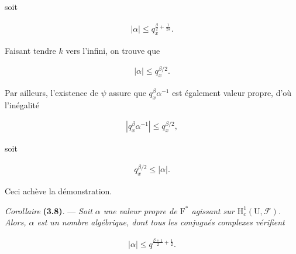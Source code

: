 \documentclass[10pt,leqno]{article}
\begin{document}
\noindent soit\par

\begin{equation*}\begin{gathered}|\alpha | \leq  q_{x}^{\frac{\beta}{2}+\frac{1}{2k}}.\end{gathered}\end{equation*}

\noindent Faisant tendre \(k\) vers l’infini, on trouve que\par

\begin{equation*}\begin{gathered}|\alpha | \leq  q_{x}^{\beta /2}.\end{gathered}\end{equation*}

\noindent Par ailleurs, l’existence de \(\psi \) assure que \(q_{x}^{\beta } \alpha ^{- 1}\) est également valeur propre, d’où l’inégalité\par

\begin{equation*}\begin{gathered}|q_{x}^{\beta } \alpha ^{- 1}| \leq  q_{x}^{\beta /2},\end{gathered}\end{equation*}

\noindent soit\par

\begin{equation*}\begin{gathered}q_{x}^{\beta /2} \leq  |\alpha |.\end{gathered}\end{equation*}

\noindent Ceci achève la démonstration.\par

\clearpage

\label{physical-15}\par\smallskip

\noindent \emph{Corollaire} \textbf{(3.8)}. — {\itshape Soit \(\alpha \) une valeur propre de \(\mathrm{F}^{*}\) agissant sur \(\mathrm{H}_{c}^{1}(\mathrm{U},\mathcal{F} )\). Alors, \(\alpha \) est un nombre algébrique, dont tous les conjugués complexes vérifient}\par

\begin{equation*}\begin{gathered}|\alpha | \leq  q^{\frac{\beta+1}{2}+\frac{1}{2}}.\end{gathered}\end{equation*}
\end{document}
